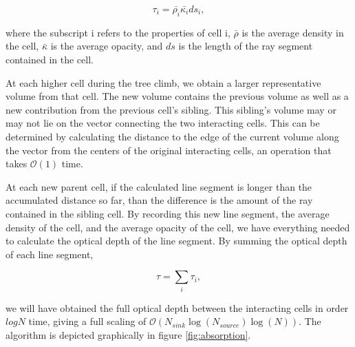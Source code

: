 \begin{equation}
\label{eq:averageopticaldepth}
\tau_i = \bar{\rho_i}\bar{\kappa_i}ds_i,
\end{equation}

\noindent
where the subscript i refers to the properties of cell i, $\bar{\rho}$ is the average density in the cell, $\bar{\kappa}$ is the average opacity, and $ds$ is the length of the ray segment contained in the cell.

At each higher cell during the tree climb, we obtain a larger representative volume from that cell. The new volume contains the previous volume as well as a new contribution from the previous cell's sibling. This sibling's volume may or may not lie on the vector connecting the two interacting cells. This can be determined by calculating the distance to the edge of the current volume along the vector from the centers of the original interacting cells, an operation that takes $\mathcal{O}(1)$ time.

At each new parent cell, if the calculated line segment is longer than the accumulated distance so far, than the difference is the amount of the ray contained in the sibling cell. By recording this new line segment, the average density of the cell, and the average opacity of the cell, we have everything needed to calculate the optical depth of the line segment. By summing the optical depth of each line segment, 

\begin{equation}
\label{eq:sumtau}
\tau = \sum_i \tau_i,
\end{equation}

\noindent
we will have obtained the full optical depth between the interacting cells in order $log{N}$ time, giving a full scaling of $\mathcal{O}(N_{sink}\log(N_{source})\log(N))$. The algorithm is depicted graphically in figure \ref{fig:absorption}.


